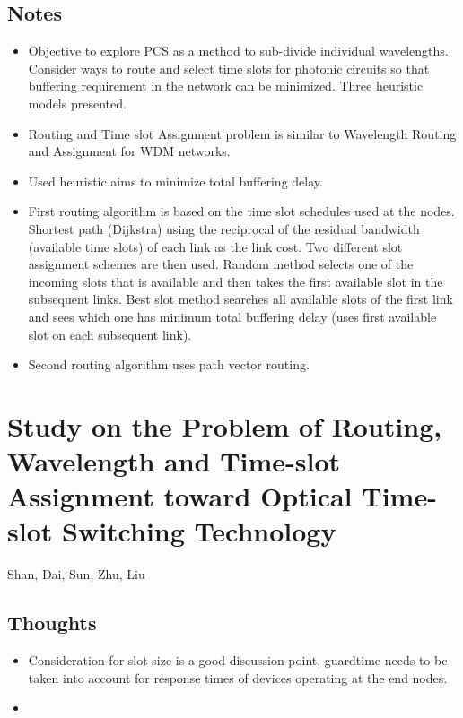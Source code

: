 \documentclass{article}
\begin{document}
\subsection{Notes}
\begin{itemize}
    \item Objective to explore PCS as a method to sub-divide individual wavelengths. Consider ways to route and select time slots for photonic circuits so that buffering requirement in the network can be minimized.  Three heuristic models presented.
    \item Routing and Time slot Assignment problem is similar to Wavelength Routing and Assignment for WDM networks.
    \item Used heuristic aims to minimize total buffering delay.
    \item First routing algorithm is based on the time slot schedules used at the nodes.  Shortest path (Dijkstra) using the reciprocal of the residual bandwidth (available time slots) of each link as the link cost.  Two different slot assignment schemes are then used.  Random method selects one of the incoming slots that is available and then takes the first available slot in the subsequent links.  Best slot method searches all available slots of the first link and sees which one has minimum total buffering delay (uses first available slot on each subsequent link).
    \item Second routing algorithm uses path vector routing.
\end{itemize}


\section{Study on the Problem of Routing, Wavelength and Time-slot Assignment toward Optical Time-slot Switching Technology}
Shan, Dai, Sun, Zhu, Liu

\subsection{Thoughts}
\begin{itemize}
    \item Consideration for slot-size is a good discussion point, guardtime needs to be taken into account for response times of devices operating at the end nodes.
    \item
\end{itemize}
\end{document}
